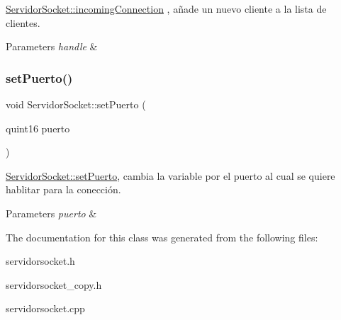 \hyperlink{class_servidor_socket_ad72a3bb3c5ea8a940060d964fba86a9c}{Servidor\+Socket\+::incoming\+Connection} , añade un nuevo cliente a la lista de clientes. 


\begin{DoxyParams}{Parameters}
{\em handle} & \\
\hline
\end{DoxyParams}
\mbox{\label{class_servidor_socket_a331c56c842d1b9a4150ec439fef6431d}} 
\subsubsection{\texorpdfstring{set\+Puerto()}{setPuerto()}}
{\footnotesize\ttfamily void Servidor\+Socket\+::set\+Puerto (\begin{DoxyParamCaption}\item[{quint16}]{puerto }\end{DoxyParamCaption})}



\hyperlink{class_servidor_socket_a331c56c842d1b9a4150ec439fef6431d}{Servidor\+Socket\+::set\+Puerto}, cambia la variable por el puerto al cual se quiere hablitar para la conección. 


\begin{DoxyParams}{Parameters}
{\em puerto} & \\
\hline
\end{DoxyParams}


The documentation for this class was generated from the following files\+:\begin{DoxyCompactItemize}
\item 
servidorsocket.\+h\item 
servidorsocket\+\_\+copy.\+h\item 
servidorsocket.\+cpp\end{DoxyCompactItemize}

